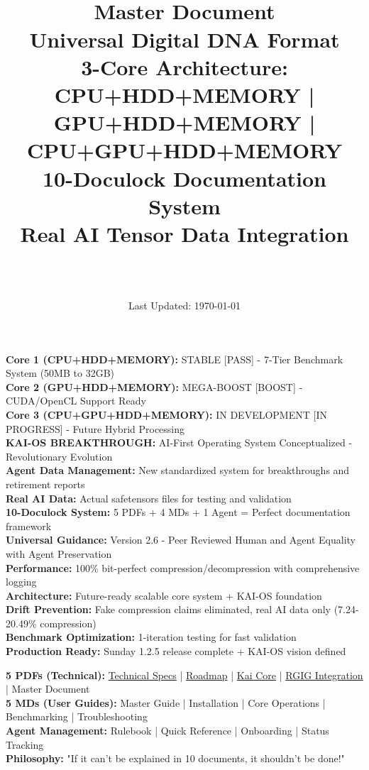 \documentclass[12pt,a4paper]{article}
\title{\Huge\textbf{\project\ \version}\\[0.5cm]
\Large\textbf{Master Document}\\[0.3cm]
\large Universal Digital DNA Format\\[0.5cm]
\large 3-Core Architecture: CPU+HDD+MEMORY | GPU+HDD+MEMORY | CPU+GPU+HDD+MEMORY\\[0.3cm]
\large 10-Doculock Documentation System\\[0.3cm]
\large Real AI Tensor Data Integration}
\author{\Large\authorname\\[0.2cm]\email\\[0.2cm]\github}
\date{\large Last Updated: \today}
\begin{document}
\maketitle
\thispagestyle{empty}

\begin{tcolorbox}[colback=blue!10,colframe=blue!50,title=\textbf{V2.6 - 3-Core System - AGENT DATA MANAGEMENT}]
\textbf{Core 1 (CPU+HDD+MEMORY):} STABLE [PASS] - 7-Tier Benchmark System (50MB to 32GB)\\
\textbf{Core 2 (GPU+HDD+MEMORY):} MEGA-BOOST [BOOST] - CUDA/OpenCL Support Ready\\
\textbf{Core 3 (CPU+GPU+HDD+MEMORY):} IN DEVELOPMENT [IN PROGRESS] - Future Hybrid Processing\\
\textbf{KAI-OS BREAKTHROUGH:} AI-First Operating System Conceptualized - Revolutionary Evolution\\
\textbf{Agent Data Management:} New standardized system for breakthroughs and retirement reports\\
\textbf{Real AI Data:} Actual safetensors files for testing and validation\\
\textbf{10-Doculock System:} 5 PDFs + 4 MDs + 1 Agent = Perfect documentation framework\\
\textbf{Universal Guidance:} Version 2.6 - Peer Reviewed Human and Agent Equality with Agent Preservation\\
\textbf{Performance:} 100\% bit-perfect compression/decompression with comprehensive logging\\
\textbf{Architecture:} Future-ready scalable core system + KAI-OS foundation\\
\textbf{Drift Prevention:} Fake compression claims eliminated, real AI data only (7.24-20.49\% compression)\\
\textbf{Benchmark Optimization:} 1-iteration testing for fast validation\\
\textbf{Production Ready:} Sunday 1.2.5 release complete + KAI-OS vision defined
\end{tcolorbox}

\begin{tcolorbox}[colback=green!10,colframe=green!50,title=\textbf{10-DOCULOCK DOCUMENTATION SYSTEM}]
\textbf{5 PDFs (Technical):} \href{MMH-RS_TECHNICAL_COMPLETE.pdf}{Technical Specs} | \href{MMH-RS_ROADMAP_COMPLETE.pdf}{Roadmap} | \href{KAI_CORE_INTEGRATION_COMPLETE.pdf}{Kai Core} | \href{RGIG_INTEGRATION_COMPLETE.pdf}{RGIG Integration} | Master Document\\
\textbf{5 MDs (User Guides):} Master Guide | Installation | Core Operations | Benchmarking | Troubleshooting\\
\textbf{Agent Management:} Rulebook | Quick Reference | Onboarding | Status Tracking\\
\textbf{Philosophy:} "If it can't be explained in 10 documents, it shouldn't be done!"
\end{tcolorbox}
\end{document}
